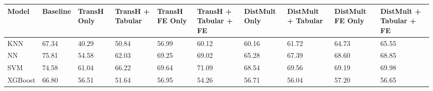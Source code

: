 \begin{tabular}{llllllllll}
\toprule
Model & Baseline & TransH Only & TransH + Tabular & TransH FE Only & TransH + Tabular + FE & DistMult Only & DistMult + Tabular & DistMult FE Only & DistMult + Tabular + FE \\
\midrule
KNN & 67.34 & 40.29 & 50.84 & 56.99 & 60.12 & 60.16 & 61.72 & 64.73 & 65.55 \\
NN & 75.81 & 54.58 & 62.03 & 69.25 & 69.02 & 65.28 & 67.39 & 68.60 & 68.85 \\
SVM & 74.58 & 61.04 & 66.22 & 69.64 & 71.09 & 68.54 & 69.56 & 69.19 & 69.98 \\
XGBoost & 66.80 & 56.51 & 51.64 & 56.95 & 54.26 & 56.71 & 56.04 & 57.20 & 56.65 \\
\bottomrule
\end{tabular}
